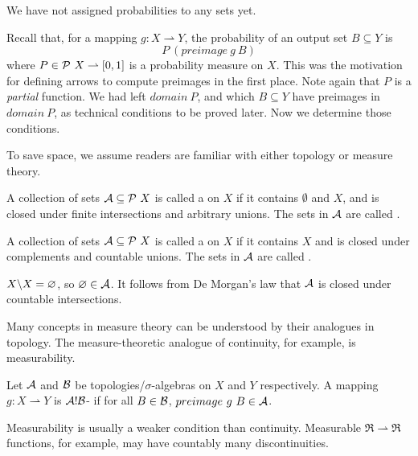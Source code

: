 \documentclass[preprint]{sigplanconf}
\newcommand{\pto}{\rightharpoonup}
\begin{document}
We have not assigned probabilities to any sets yet.

Recall that, for a mapping $g : X \pto Y$, the probability of an output set $B \subseteq Y$ is
\begin{equation}
	P~(preimage~g~B)
\end{equation}
where $P \in \powerset~X \pto [0,1]$ is a probability measure on $X$.
This was the motivation for defining arrows to compute preimages in the first place.
Note again that $P$ is a \emph{partial} function.
We had left $domain~P$, and which $B \subseteq Y$ have preimages in $domain~P$, as technical conditions to be proved later.
Now we determine those conditions.

To save space, we assume readers are familiar with either topology or measure theory.

\begin{definition}
A collection of sets $\mathcal{A} \subseteq \mathcal{P}~X$ is called a  on $X$ if it contains $\emptyset$ and $X$, and is closed under finite intersections and arbitrary unions.
The sets in $\mathcal{A}$ are called .
\end{definition}

\begin{definition}
A collection of sets $\mathcal{A} \subseteq \mathcal{P}~X$ is called a  on $X$ if it contains $X$ and is closed under complements and countable unions.
The sets in $\mathcal{A}$ are called .
\end{definition}

$X \backslash X = \varnothing$, so $\varnothing \in \mathcal{A}$.
It follows from De Morgan's law that $\mathcal{A}$ is closed under countable intersections.

Many concepts in measure theory can be understood by their analogues in topology.
The measure-theoretic analogue of continuity, for example, is measurability.

\begin{definition}
Let $\mathcal{A}$ and $\mathcal{B}$ be topologies/$\sigma$-algebras on $X$ and $Y$ respectively.
A mapping $g : X \pto Y$ is $\mathcal{A}!\mathcal{B}$- if for all $B \in \mathcal{B}$, $preimage~g~B \in \mathcal{A}$.
\end{definition}


Measurability is usually a weaker condition than continuity.
Measurable $\Re \pto \Re$ functions, for example, may have countably many discontinuities.
\end{document}
